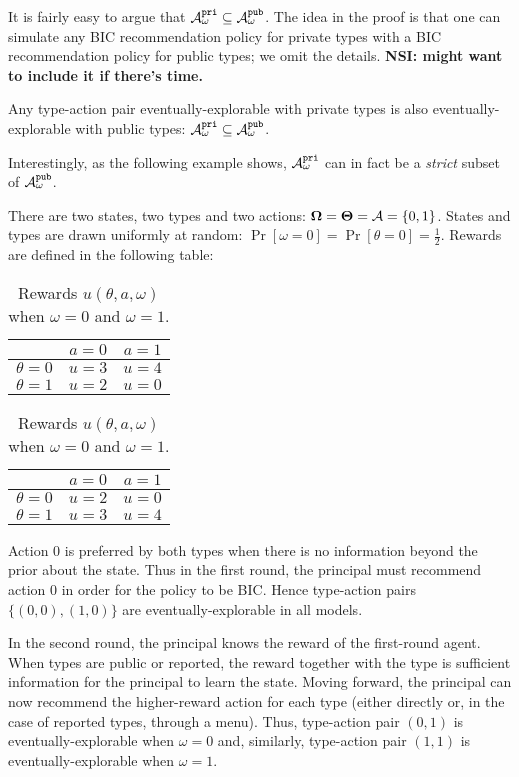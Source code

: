 It is fairly easy to argue that $\mathcal{A}_{\omega}^{\mathtt{pri}} \subseteq \mathcal{A}_{\omega}^{\mathtt{pub}}$. The idea in the proof is that one can simulate any BIC recommendation policy for private types with a BIC recommendation policy for public types; we omit the details. {\bf NSI: might want to include it if there's time.}

\begin{claim}
	Any type-action pair eventually-explorable with private types is also eventually-explorable with public types: $\mathcal{A}_{\omega}^{\mathtt{pri}} \subseteq \mathcal{A}_{\omega}^{\mathtt{pub}}$.
\end{claim}


Interestingly, as the following example shows, $\mathcal{A}_{\omega}^{\mathtt{pri}}$ can in fact be a {\em strict} subset of $\mathcal{A}_{\omega}^{\mathtt{pub}}$.  

\begin{example}
	\label{exp:simple}
	There are two states, two types and two actions: 
	$\bold{\Omega} = \bold{\Theta} = \mathcal{A} = \{0,1\}$. 
	States and types are drawn uniformly at random:
	$\Pr[\omega =0] =\Pr[\theta =0] = \tfrac12$. 
	Rewards are defined in the following table:\\
	\begin{table}[H]
		\centering
		\begin{tabular}{|c||c|c|}
			\hline
			&$a=0$&$a=1$\\
			\hline
			\hline
			$\theta = 0$& $u = 3$ & $u =4$\\
			\hline
			$\theta = 1$& $u = 2$ & $u =0$\\
			\hline
		\end{tabular}
		\quad
		\begin{tabular}{|c||c|c|}
			\hline
			&$a=0$&$a=1$\\
			\hline
			\hline
			$\theta = 0$& $u = 2$ & $u =0$\\
			\hline
			$\theta = 1$& $u = 3$ & $u =4$\\
			\hline
		\end{tabular}
		\caption{Rewards $u(\theta,a,\omega)$ when $\omega =0 $ and $\omega = 1$.}
	\end{table}
\end{example}

Action 0 is preferred by both types when there is no information beyond the prior about the state. Thus in the first round, the principal must recommend action $0$ in order for the policy to be BIC.  Hence type-action pairs $\{(0,0),(1,0)\}$ are eventually-explorable in all models.

In the second round, the principal knows the reward of the first-round agent.  When types are public or reported, the reward together with the type is sufficient information for the principal to learn the state.  Moving forward, the principal can now recommend the higher-reward action for each type (either directly or, in the case of reported types, through a menu).  Thus, type-action pair $(0,1)$ is eventually-explorable when $\omega=0$ and, similarly, type-action pair $(1,1)$ is eventually-explorable when $\omega=1$.

